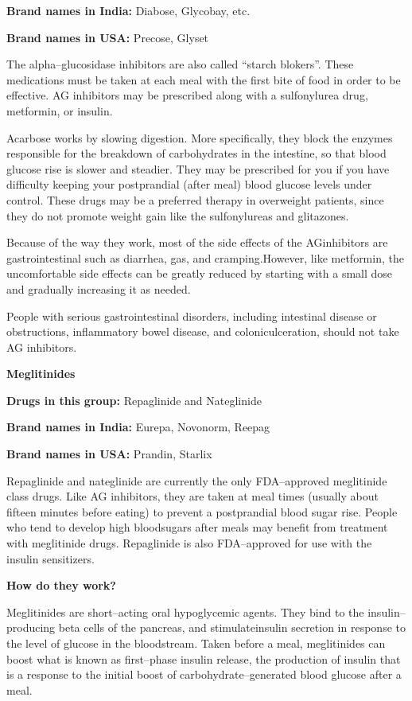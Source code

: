 \textbf{Brand names in India:} Diabose, Glycobay, etc.

\textbf{Brand names in USA:} Precose, Glyset

The alpha–glucosidase inhibitors are also called “starch blokers”. These medications must be taken at each meal with the first bite of food in order to be effective. AG inhibitors may be prescribed along with a sulfonylurea drug, metformin, or insulin.

Acarbose works by slowing digestion. More specifically, they block the enzymes responsible for the breakdown of carbohydrates in the intestine, so that blood glucose rise is slower and steadier. They may be prescribed for you if you have difficulty keeping your postprandial (after meal) blood glucose levels under control. These drugs may be a preferred therapy in overweight patients, since they do not promote weight gain like the sulfonylureas and glitazones.

Because of the way they work, most of the side effects of the AG\break inhibitors are gastrointestinal such as diarrhea, gas, and cramping.\break However, like metformin, the uncomfortable side effects can be greatly reduced by starting with a small dose and gradually increasing it as needed.

People with serious gastrointestinal disorders, including intestinal disease or obstructions, inflammatory bowel disease, and colonic\break ulceration, should not take AG inhibitors.

\textbf{Meglitinides}

\textbf{Drugs in this group:} Repaglinide and Nateglinide

\textbf{Brand names in India:} Eurepa, Novonorm, Reepag

\textbf{Brand names in USA:} Prandin, Starlix

Repaglinide and nateglinide are currently the only FDA–approved meglitinide class drugs. Like AG inhibitors, they are taken at meal times (usually about fifteen minutes before eating) to prevent a postprandial blood sugar rise. People who tend to develop high blood\break sugars after meals may benefit from treatment with meglitinide drugs. Repaglinide is also FDA–approved for use with the insulin sensitizers.

\noindent\textbf{How do they work?}

Meglitinides are short–acting oral hypoglycemic agents. They bind to the insulin–producing beta cells of the pancreas, and stimulate\break insulin secretion in response to the level of glucose in the bloodstream. Taken before a meal, meglitinides can boost what is known as first–phase insulin release, the production of insulin that is a response to the initial boost of carbohydrate–generated blood glucose after a meal.

